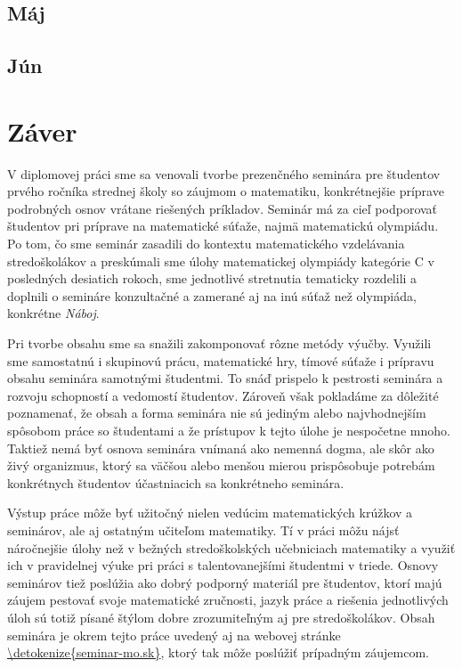 \section{Máj}




\section{Jún}



\chapter*{Záver} \label{chap:zaver}

V diplomovej práci sme sa venovali tvorbe prezenčného seminára pre študentov prvého ročníka strednej školy so záujmom o matematiku, konkrétnejšie príprave podrobných osnov vrátane riešených príkladov. Seminár má za cieľ podporovať študentov pri príprave na matematické súťaže, najmä matematickú olympiádu. Po tom, čo sme seminár zasadili do kontextu matematického vzdelávania stredoškolákov a preskúmali sme úlohy matematickej olympiády kategórie C v posledných desiatich rokoch, sme jednotlivé stretnutia tematicky rozdelili a doplnili o semináre konzultačné a zamerané aj na inú súťaž než olympiáda, konkrétne \textit{Náboj}.

Pri tvorbe obsahu sme sa snažili zakomponovať rôzne metódy výučby. Využili sme samostatnú i skupinovú prácu, matematické hry, tímové súťaže i prípravu obsahu seminára samotnými študentmi. To snáď prispelo k pestrosti seminára a rozvoju schopností a vedomostí študentov. Zároveň však pokladáme za dôležité poznamenať, že obsah a forma seminára nie sú jediným  alebo najvhodnejším spôsobom práce so študentami a že prístupov k tejto úlohe je nespočetne mnoho. Taktiež nemá byť osnova seminára vnímaná ako nemenná dogma, ale skôr ako živý organizmus, ktorý sa väčšou alebo menšou mierou prispôsobuje potrebám konkrétnych študentov účastniacich sa konkrétneho seminára.

Výstup práce môže byť užitočný nielen vedúcim matematických krúžkov a seminárov, ale aj ostatným učiteľom matematiky. Tí v práci môžu nájsť náročnejšie úlohy než v bežných stredoškolských učebniciach matematiky a využiť ich v pravidelnej výuke pri práci s talentovanejšími študentmi v triede. Osnovy seminárov tiež poslúžia ako dobrý podporný materiál pre študentov, ktorí majú záujem pestovať svoje matematické zručnosti, jazyk práce a riešenia jednotlivých úloh sú totiž písané štýlom dobre zrozumiteľným aj pre stredoškolákov. Obsah seminára je okrem tejto práce uvedený aj na webovej stránke \url{\detokenize{seminar-mo.sk}}, ktorý tak môže poslúžiť prípadným záujemcom.

